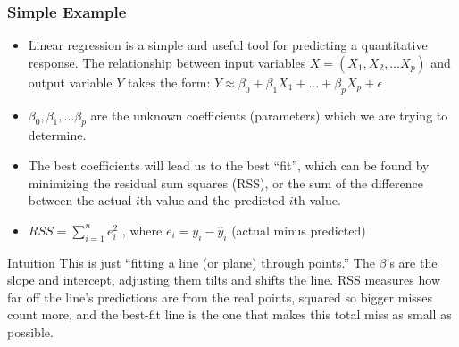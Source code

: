 \begin{frame}[fragile]\frametitle{Simple Example}
\begin{itemize}
\item Linear regression is a simple and useful tool for predicting
a quantitative response. The relationship between input
variables $X = (X_1 , X_2 , \ldots X_p )$ and output variable $Y$ takes
the form: $Y \approx \beta_0 + \beta_1 X_1 + \ldots + \beta_p X_p + \epsilon$
\item $\beta_0 , \beta_1 ,\ldots \beta_p$ are the unknown coefficients (parameters) which
we are trying to determine.
\item The best coefficients will lead us to the best ``fit'', which can be found by
minimizing the residual sum squares (RSS), or the sum of the difference between the actual $i$th value and
the predicted $i$th value.
\item $RSS = \sum_{i=1}^n e_i^2$ , where $e_i = y_i - \hat{y}_i$ (actual minus predicted)
\end{itemize}
\begin{block}{Intuition}
This is just ``fitting a line (or plane) through points.'' The $\beta$'s are the slope and intercept, adjusting them tilts and shifts the line. RSS measures how far off the line's predictions are from the real points, squared so bigger misses count more, and the best-fit line is the one that makes this total miss as small as possible.
\end{block}
\end{frame}


